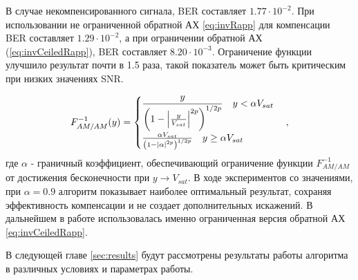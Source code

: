 В случае некомпенсированного сигнала, BER составляет $1.77\cdot 10^{-2}$.
При использовании не ограниченной обратной АХ \ref{eq:invRapp} для
компенсации BER составляет $1.29\cdot 10^{-2}$, а при ограничении обратной
АХ (\ref{eq:invCeiledRapp}), BER составляет $8.20 \cdot 10^{-3}$.
Ограничение функции улучшило результат почти в 1.5 раза, такой показатель
может быть критическим при низких значениях SNR.

\begin{equation}
    F^{-1}_{AM/AM}(y) = 
    \begin{cases}
        \displaystyle
       \frac{ y}{\left( 1 - \abs{\frac{y}{V_{sat}}}^{2p}\right)^{1/2p}}
       \quad y <\alpha V_{sat}\\
       \frac{ \alpha V_{sat}}{\left( 1 - \abs{\alpha}^{2p}\right)^{1/2p}}
       \quad y \geq \alpha V_{sat}
    \end{cases},
    \label{eq:invCeiledRapp}
\end{equation}
где $\alpha$ - граничный коэффициент, обеспечивающий ограничение функции
$F^{-1}_{AM/AM}$ от достижения бесконечности при $y \rightarrow V_{sat}$. В
ходе экспериментов со значениями, при $\alpha=0.9$ алгоритм показывает
наиболее оптимальный результат, сохраняя эффективность компенсации и не
создает дополнительных искажений. В дальнейшем в работе использовалась
именно ограниченная версия обратной АХ \ref{eq:invCeiledRapp}.

В следующей главе \ref{sec:results} будут рассмотрены результаты работы алгоритма в различных
условиях и параметрах работы.



